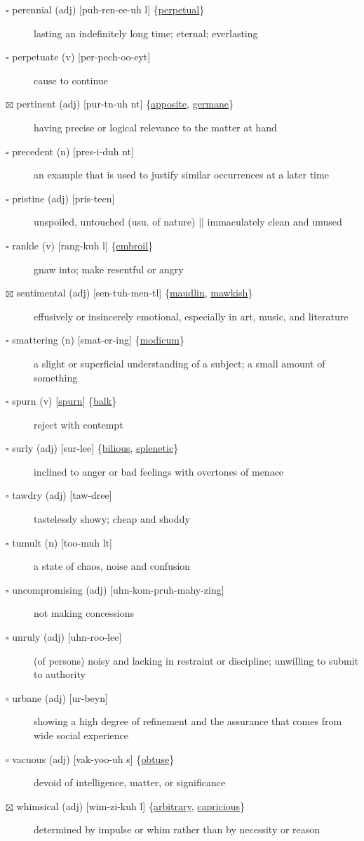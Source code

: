 \documentclass[11pt]{article}
\begin{document}
\begin{description}
\item[{$\square$ perennial (adj) [puh-ren-ee-uh l] \{\hyperref[orgc0edc80]{perpetual}\}}] lasting an indefinitely long time; eternal; everlasting
\item[{$\square$ \label{orgc0edc80} perpetuate (v) [per-pech-oo-eyt]}] cause to continue
\item[{$\boxtimes$ \label{org93638fe}pertinent (adj) [pur-tn-uh nt] \{\hyperref[org609a5a6]{apposite}, \hyperref[orgde699fa]{germane}\}}] having precise or logical relevance to the matter at hand
\item[{$\square$ precedent (n) [pres-i-duh nt]}] an example that is used to justify similar occurrences at a later time
\item[{$\square$ pristine (adj) [pris-teen]}] unspoiled, untouched (usu. of nature) || immaculately clean and unused
\item[{$\square$ \label{org6fa3146}rankle (v) [rang-kuh l] \{\hyperref[orgc4738cb]{embroil}\}}] gnaw into; make resentful or angry
\item[{$\boxtimes$ \label{org452b84f}sentimental (adj) [sen-tuh-men-tl] \{\hyperref[org4160f55]{maudlin}, \hyperref[org0099c38]{mawkish}\}}] effusively or insincerely emotional, especially in art, music, and literature
\item[{$\square$ \label{org8c431ea}smattering (n) [smat-er-ing] \{\hyperref[org520b8ae]{modicum}\}}] a slight or superficial understanding of a subject; a small amount of something
\item[{$\square$ \label{org82b46fa}spurn (v) [\hyperref[org82b46fa]{spurn}] \{\hyperref[org368dc62]{balk}\}}] reject with contempt
\item[{$\square$ \label{orgb7ecd9a}surly (adj) [sur-lee] \{\hyperref[org702a6c2]{bilious}, \hyperref[org5650bf8]{splenetic}\}}] inclined to anger or bad feelings with overtones of menace
\item[{$\square$ tawdry (adj) [taw-dree]}] tastelessly showy; cheap and shoddy
\item[{$\square$ tumult (n) [too-muh lt]}] a state of chaos, noise and confusion
\item[{$\square$ uncompromising (adj) [uhn-kom-pruh-mahy-zing]}] not making concessions
\item[{$\square$ unruly (adj) [uhn-roo-lee]}] (of persons) noisy and lacking in restraint or discipline; unwilling to submit to authority
\item[{$\square$ urbane (adj) [ur-beyn]}] showing a high degree of refinement and the assurance that comes from wide social experience
\item[{$\square$ \label{org47f0b96}vacuous (adj) [vak-yoo-uh s] \{\hyperref[org69e0c85]{obtuse}\}}] devoid of intelligence, matter, or significance
\item[{$\boxtimes$ \label{org8101a2d} \label{org77ef95d}whimsical (adj) [wim-zi-kuh l] \{\hyperref[org23782c5]{arbitrary}, \hyperref[orgef62d01]{capricious}\}}] determined by impulse or whim rather than by necessity or reason
\end{description}
\end{document}
